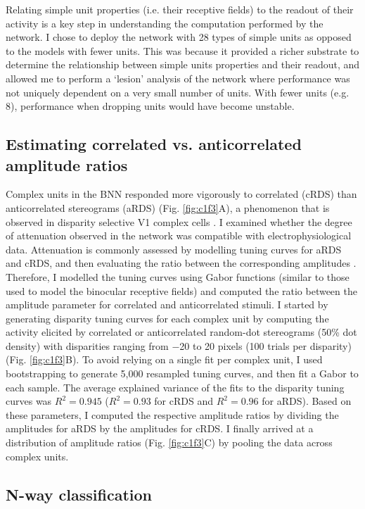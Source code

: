 Relating simple unit properties (i.e. their receptive fields) to the readout of their activity is a key step in understanding the computation performed by the network. I chose to deploy the network with 28 types of simple units as opposed to the models with fewer units. This was because it provided a richer substrate to determine the relationship between simple units properties and their readout, and allowed me to perform a `lesion' analysis of the network where performance was not uniquely dependent on a very small number of units. With fewer units (e.g. 8), performance when dropping units would have become unstable.


\subsection*{Estimating correlated vs. anticorrelated amplitude ratios}

Complex units in the BNN responded more vigorously to correlated (cRDS) than anticorrelated stereograms (aRDS) (Fig. \ref{fig:c1f3}A), a phenomenon that is observed in disparity selective V1 complex cells \cite{Cumming:1997ve,Samonds:2013cs}. I examined whether the degree of attenuation observed in the network was compatible with electrophysiological data. Attenuation is commonly assessed by modelling tuning curves for aRDS and cRDS, and then evaluating the ratio between the corresponding amplitudes \cite{Cumming:1997ve,Tanabe:2004mw,Nieder:2001jl}. Therefore, I modelled the tuning curves using Gabor functions (similar to those used to model the binocular receptive fields) and computed the ratio between the amplitude parameter for correlated and anticorrelated stimuli. I started by generating disparity tuning curves for each complex unit by computing the activity elicited by correlated or anticorrelated random-dot stereograms (50\% dot density) with disparities ranging from $-$20 to 20 pixels (100 trials per disparity) (Fig. \ref{fig:c1f3}B). To avoid relying on a single fit per complex unit, I used bootstrapping to generate 5,000 resampled tuning curves, and then fit a Gabor to each sample. The average explained variance of the fits to the disparity tuning curves was $R^2 = 0.945$ ($R^2=0.93$ for cRDS and $R^2=0.96$ for aRDS). Based on these parameters, I computed the respective amplitude ratios by dividing the amplitudes for aRDS by the amplitudes for cRDS. I finally arrived at a distribution of amplitude ratios (Fig. \ref{fig:c1f3}C) by pooling the data across complex units.

\subsection*{N-way classification}

